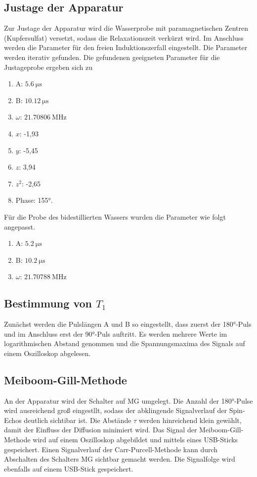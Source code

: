 \subsection{Justage der Apparatur}
Zur Justage der Apparatur wird die Wasserprobe mit paramagnetischen Zentren (Kupfersulfat)
versetzt, sodass die Relaxationszeit verkürzt wird. Im Anschluss werden die Parameter
für den freien Induktionszerfall eingestellt.
Die Parameter werden iterativ gefunden. Die gefundenen geeigneten Parameter für die
Justageprobe ergeben sich zu
\begin{enumerate}
  \item A: $\SI{5,6}{\micro\second}$
  \item B: $\SI{10,12}{\micro\second}$
  \item $\omega$: $\SI{21,70806}{\mega\hertz}$
  \item $x$: -1,93
  \item $y$: -5,45
  \item $z$: 3,94
  \item $z^2$: -2,65
  \item Phase: 155°.
\end{enumerate}
Für die Probe des bidestillierten Wassers wurden die Parameter wie folgt angepasst.
\begin{enumerate}
  \item A: $\SI{5,2}{\micro\second}$
  \item B: $\SI{10,2}{\micro\second}$
  \item $\omega$: $\SI{21,70788}{\mega\hertz}$
\end{enumerate}

\subsection{Bestimmung von $T_1$}

Zunächst werden die Pulslängen A und B so eingestellt, dass zuerst der 180°-Puls und im
Anschluss erst der 90°-Puls auftritt. Es werden mehrere Werte im logarithmischen Abstand
genommen und die Spannungsmaxima des Signals auf einem Oszilloskop abgelesen.

\subsection{Meiboom-Gill-Methode}

An der Apparatur wird der Schalter auf MG umgelegt. Die Anzahl der 180°-Pulse
wird ausreichend groß eingestllt, sodass der abklingende Signalverlauf der Spin-Echos
deutlich sichtibar ist. Die Abstände $\tau$ werden hinreichend klein gewählt, damit
der Einfluss der Diffusion minimiert wird.
Das Signal der Meiboom-Gill-Methode wird auf einem Oszilloskop abgebildet und mittels
eines USB-Sticks gespeichert.
Einen Signalverlauf der Carr-Purcell-Methode kann durch Abschalten des Schalters MG
sichtbar gemacht werden. Die Signalfolge wird ebenfalls auf einem USB-Stick gespeichert.

